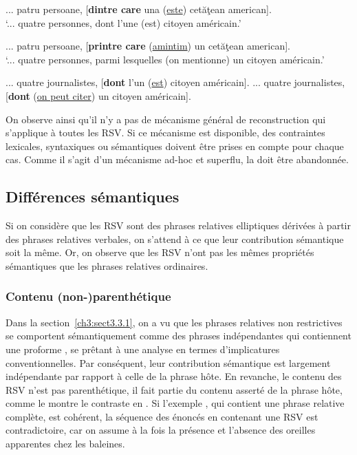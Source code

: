 \ea \label{ch3:ex100}
\ea ... patru persoane, [\textbf{dintre care} una (\uline{este}) cetăţean american]. \label{ch3:ex100a}\\
\glt ‘... quatre personnes, dont l’une (est) citoyen américain.’

\ex ... patru persoane, [\textbf{printre care} (\uline{amintim}) un cetăţean american]. \label{ch3:ex100b}\\
\glt ‘... quatre personnes, parmi lesquelles (on mentionne) un citoyen américain.’ 
\z 
\z


\ea \label{ch3:ex101}
\ea
... quatre journalistes, [\textbf{dont} l’un (\uline{est}) citoyen américain]. \label{ch3:ex101a}
\ex
... quatre journalistes, [\textbf{dont} (\uline{on peut citer})\textbf{} un citoyen américain]. \label{ch3:ex101b} 
\z 
\z 

On observe ainsi qu’il n’y a pas de mécanisme général de reconstruction qui s’applique à toutes les RSV. Si ce mécanisme est disponible, des contraintes lexicales, syntaxiques ou sémantiques doivent être prises en compte pour chaque cas. Comme il s’agit d’un mécanisme ad-hoc et superflu, la  doit être abandonnée.  


\subsection{Différences sémantiques}\label{ch3:sect3.4.2}

Si on considère que les RSV sont des phrases relatives elliptiques dérivées à partir des phrases relatives verbales, on s’attend à ce que leur contribution sémantique soit la même. Or, on observe que les RSV n’ont pas les mêmes propriétés sémantiques que les phrases relatives ordinaires.


\subsubsection{Contenu (non-)parenthétique}\label{ch3:sect3.4.2.1}

Dans la section~\ref{ch3:sect3.3.1}, on a vu que les phrases relatives non restrictives se comportent sémantiquement comme des phrases indépendantes qui contiennent une proforme \citep{Arnold2004}, se prêtant à une analyse en termes d’implicatures con\-ventionnelles. Par conséquent, leur contribution sémantique est largement indépendante par rapport à celle de la phrase hôte. En revanche, le contenu des RSV n’est pas parenthétique, {\cad} il fait partie du contenu asserté de la phrase hôte, comme le montre le contraste en . Si l’exemple , qui contient une phrase relative complète, est cohérent, la séquence des énoncés en  contenant une RSV est contradictoire, car on assume à la fois la présence et l’absence des oreilles apparentes chez les baleines. 

